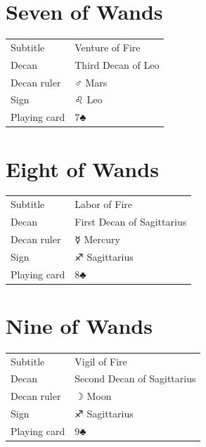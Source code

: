\newpage
\section*{Seven of Wands}

\begin{center}
\end{center}

\vspace{4mm}
\noindent\begin{tabular}{@{}l@{\quad}l@{}}
Subtitle & Venture of Fire \\
Decan & Third Decan of Leo \\
Decan ruler & {\symbfont ♂} Mars \\
Sign & {\symbfont ♌} Leo \\
Playing card & 7♣ \\
\end{tabular}

\newpage
\section*{Eight of Wands}

\begin{center}
\end{center}

\vspace{4mm}
\noindent\begin{tabular}{@{}l@{\quad}l@{}}
Subtitle & Labor of Fire \\
Decan & First Decan of Sagittarius \\
Decan ruler & {\symbfont ☿} Mercury \\
Sign & {\symbfont ♐} Sagittarius \\
Playing card & 8♣ \\
\end{tabular}

\newpage
\section*{Nine of Wands}

\begin{center}
\end{center}

\vspace{4mm}
\noindent\begin{tabular}{@{}l@{\quad}l@{}}
Subtitle & Vigil of Fire \\
Decan & Second Decan of Sagittarius \\
Decan ruler & {\symbfont ☽} Moon \\
Sign & {\symbfont ♐} Sagittarius \\
Playing card & 9♣ \\
\end{tabular}

